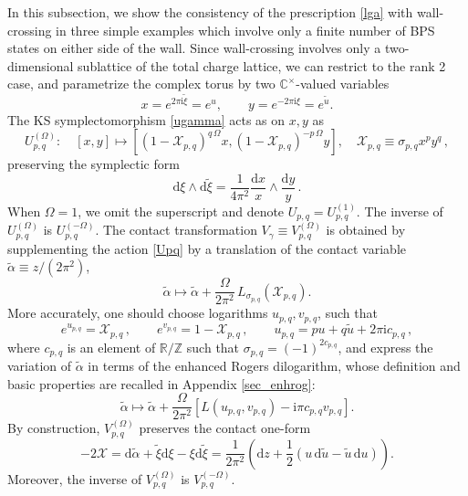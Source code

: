 \documentclass[12pt,reqno]{article}
\numberwithin{equation}{section}
\newcommand{\be}{\begin{equation}}
\newcommand{\ee}{\end{equation}}
\newcommand{\de}{\mathrm{d}}
\newcommand{\I}{\mathrm{i}}
\newcommand{\cX}{\mathcal{X}}
\newcommand{\IR}{\mathbb{R}}
\newcommand{\IC}{\mathbb{C}}
\newcommand{\IZ}{\mathbb{Z}}
\def\talp{\tilde\alpha}
\newcommand{\txi}{\tilde\xi}
\def\zz{\cX}
\numberwithin{equation}{section}
\begin{document}
In this subsection, we show the consistency of the prescription \eqref{lga} with wall-crossing
in three simple examples which involve only a finite number of BPS states on either side of the
wall. Since wall-crossing involves only a two-dimensional sublattice of the total charge lattice,
we can restrict to the rank 2 case, and parametrize the complex torus by two $\IC^\times$-valued variables
\be
x=e^{2\pi\I\txi}=e^{u},
\qquad
y=e^{-2\pi\I\xi}=e^{\tilde u} .
\ee
The KS symplectomorphism \eqref{ugamma} acts as on $x,y$ as
\be
\label{Upq}
U^{(\Omega)}_{p,q}: \quad [x,y]\mapsto
[(1-\zz_{p,q})^{q\, \Omega} x, (1-\zz_{p,q})^{-p\, \Omega} y],
\quad \zz_{p,q}\equiv\sigma_{p,q} x^p y^q\, ,
\ee
preserving  the symplectic form
\be
\de \xi \wedge \de\txi  =  \frac{1}{4\pi^2} \frac{\de x}{x} \wedge \frac{\de y}{y}  \, .
\ee
When $\Omega=1$, we omit the superscript and denote $U_{p,q}=U^{(1)}_{p,q}$.
The inverse of $U^{(\Omega)}_{p,q}$ is $U^{(-\Omega)}_{p,q}$. The contact transformation
$V_\gamma\equiv V_{p,q}^{(\Omega)}$ is obtained by supplementing the action
\eqref{Upq} by a translation of the contact variable $\talp\equiv z/(2\pi^2)$,
\be
\label{Valph}
\talp \mapsto \talp + \frac{\Omega}{2\pi^2} \,
L_{\sigma_{p,q}}\left( \zz_{p,q}\right).
\ee
More accurately, one should choose logarithms $u_{p,q}, v_{p,q}$, such that
\be
e^{u_{p,q}}= \zz_{p,q}\, ,
\qquad
e^{v_{p,q}}= 1-\zz_{p,q}\, ,
\qquad
u_{p,q} = p u + q \tilde u + 2\pi \I c_{p,q}\, ,
\ee
where $c_{p,q}$ is an element of $\IR/\IZ$ such that $\sigma_{p,q}=(-1)^{2c_{p,q}}$,
and express the variation of $\talp$ in terms
of the enhanced Rogers dilogarithm, whose definition and
basic properties are recalled in Appendix \ref{sec_enhrog}:
\be
\label{Valphuv}
\talp \mapsto \talp + \frac{\Omega}{2\pi^2} \left[
L(u_{p,q},v_{p,q})-\I\pi c_{p,q} v_{p,q} \right] .
\ee
By construction, $V_{p,q}^{(\Omega)}$ preserves the contact one-form
\be
-2\cX=\de\talp+\txi\de\xi-\xi \de\txi =
\frac{1}{2\pi^2}\left( \de z+ \frac12\left(  u \, \de \tilde u -  \tilde u \, \de u \right) \right) .
\ee
Moreover, the inverse of $V_{p,q}^{(\Omega)}$ is $V_{p,q}^{(-\Omega)}$.
\end{document}
